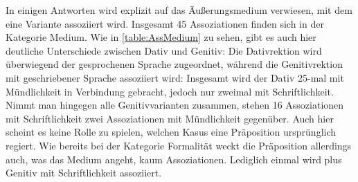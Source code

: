 In einigen Antworten wird explizit auf das Äußerungsmedium verwiesen, mit dem eine Variante assoziiert wird.  
Insgesamt 45 Assoziationen finden sich in der Kategorie \glqq Medium\grqq. 
Wie in \autoref{table:AssMedium} zu sehen, gibt es auch hier deutliche Unterschiede zwischen Dativ und Genitiv: 
Die Dativrektion wird überwiegend der gesprochenen Sprache zugeordnet, während die Genitivrektion mit geschriebener Sprache assoziiert wird: 
Insgesamt wird der Dativ 25-mal mit Mündlichkeit in Verbindung gebracht, jedoch nur zweimal mit Schriftlichkeit. 
Nimmt man hingegen alle Genitivvarianten zusammen, stehen 16 Assoziationen mit Schriftlichkeit zwei Assoziationen mit Mündlichkeit gegenüber. 
Auch hier scheint es keine Rolle zu spielen, welchen Kasus eine Präposition ursprünglich regiert. 
Wie bereits bei der Kategorie \glqq Formalität\grqq{} weckt die Präposition \gegenueber{} allerdings auch, was das Medium angeht, kaum Assoziationen. 
Lediglich einmal wird \gegenueber{} plus Genitiv mit Schriftlichkeit assoziiert.  
